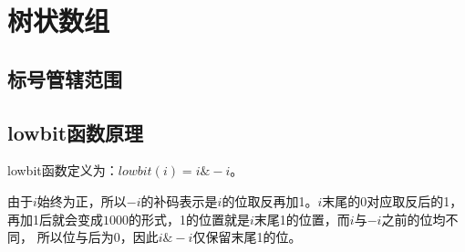 \section{树状数组}
\subsection{标号管辖范围}

\subsection{lowbit函数原理}

lowbit函数定义为：$lowbit(i)=i\&-i$。

由于$i$始终为正，所以$-i$的补码表示是$i$的位取反再加1。$i$末尾的0对应取反后的1，
再加1后就会变成$1000$的形式，1的位置就是$i$末尾1的位置，而$i$与$-i$之前的位均不同，
所以位与后为0，因此$i\&-i$仅保留末尾1的位。

